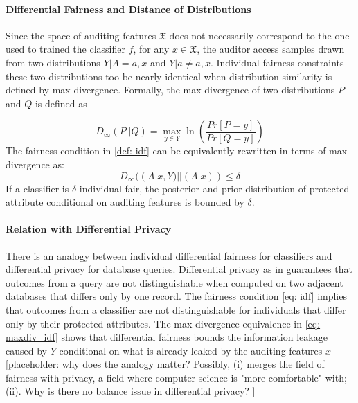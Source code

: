 \documentclass{article}
\begin{document}
\paragraph{Differential Fairness and Distance of Distributions}
Since the space of auditing features $\mathfrak{X}$ does not necessarily correspond to the one used to trained the classifier $f$, for any $x\in \mathfrak{X}$, the auditor access samples drawn from two distributions $Y|A=a, x$ and $Y|a\neq a, x$. Individual fairness constraints these two distributions too be nearly identical when distribution similarity is defined by max-divergence. Formally, the max divergence of two distributions $P$ and $Q$ is defined as 

\begin{equation}
D_{\infty}(P||Q) = \max_{y\in Y}\ln\left(\frac{Pr[P=y]}{Pr[Q=y]}\right)
\end{equation}
The fairness condition in \ref{def: idf} can be equivalently rewritten in terms of max divergence as:
\begin{equation}
\label{eq: maxdiv_idf}
D_{\infty}((A|x, Y)||(A| x)) \leq \delta
\end{equation}
If a classifier is $\delta$-individual fair, the posterior and prior distribution of protected attribute conditional on auditing features is bounded by $\delta$. 

\paragraph{Relation with Differential Privacy}
There is an analogy between individual differential fairness for classifiers and differential privacy for database queries. Differential privacy as in  \cite{dwork2014algorithmic} guarantees that outcomes from a query are not distinguishable when computed on two adjacent databases that differs only by one record. The fairness condition \eqref{eq: idf} implies that outcomes from a classifier are not distinguishable for individuals that differ only by their protected attributes. The max-divergence equivalence in \ref{eq: maxdiv_idf} shows that differential fairness bounds the information leakage caused by $Y$ conditional on what is already leaked by the auditing features $x$ [placeholder: why does the analogy matter? Possibly, (i) merges the field of fairness with privacy, a field where computer science is "more comfortable" with; (ii). Why is there no balance issue in differential privacy? ] 
\end{document}
